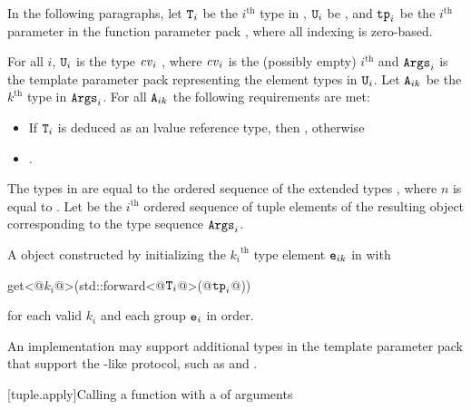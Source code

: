 \begin{itemdescr}
\pnum
In the following paragraphs, let $\texttt{T}_i$ be the $i^\text{th}$ type in ,
$\texttt{U}_i$ be , and $\texttt{tp}_i$ be the $i^\text{th}$
parameter in the function parameter pack , where all indexing is
zero-based.

\pnum
\expects
For all $i$, $\texttt{U}_i$ is the type
$\cv_i$ , where $\cv_i$ is the (possibly empty) $i^\text{th}$
 and $\texttt{Args}_i$ is the template parameter pack representing the element
types in $\texttt{U}_i$. Let $\texttt{A}_{ik}$ be the ${k}^\text{th}$ type in $\texttt{Args}_i$. For all
$\texttt{A}_{ik}$ the following requirements are met:
\begin{itemize}
\item If $\texttt{T}_i$ is deduced as an lvalue reference type, then
      , otherwise
\item {}.
\end{itemize}

\pnum
\remarks
The types in  are equal to the ordered
sequence of the extended types
,
where $n$ is
equal to . Let  be the $i^\text{th}$
ordered sequence of tuple elements of the resulting  object
corresponding to the type sequence $\texttt{Args}_i$.

\pnum
\returns
A  object constructed by initializing the ${k_i}^\text{th}$
type element $\texttt{e}_{ik}$ in  with
\begin{codeblock}
get<@$k_i$@>(std::forward<@$\texttt{T}_i$@>(@$\texttt{tp}_i$@))
\end{codeblock}
for each valid $k_i$ and each group $\texttt{e}_i$ in order.

\pnum
\begin{note}
An implementation may support additional types in the template parameter
pack  that support the -like protocol, such as
 and .
\end{note}
\end{itemdescr}

[tuple.apply]{Calling a function with a  of arguments}

